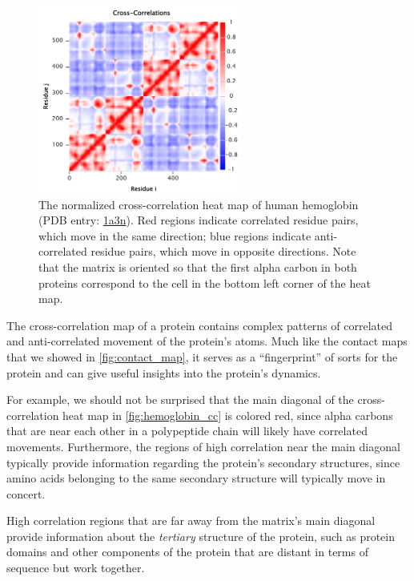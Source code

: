 \begin{figure}[h]
	\centering
	\mySfFamily
	\includegraphics[width = 0.6\textwidth]{../images/hemoglobin_cc.png}
	\caption{The normalized cross-correlation heat map of human hemoglobin (PDB entry: \href{https://www.rcsb.org/structure/1a3n}{1a3n}). Red regions indicate correlated residue pairs, which move in the same direction; blue regions indicate anti-correlated residue pairs, which move in opposite directions. Note that the matrix is oriented so that the first alpha carbon in both proteins correspond to the cell in the bottom left corner of the heat map.}
	\label{fig:hemoglobin_cc}
\end{figure}

The cross-correlation map of a protein contains complex patterns of correlated and anti-correlated movement of the protein's atoms. Much like the contact maps that we showed in \autoref{fig:contact_map}, it serves as a ``fingerprint'' of sorts for the protein and can give useful insights into the protein's dynamics.

For example, we should not be surprised that the main diagonal of the cross-correlation heat map in \autoref{fig:hemoglobin_cc} is colored red, since alpha carbons that are near each other in a polypeptide chain will likely have correlated movements. Furthermore, the regions of high correlation near the main diagonal typically provide information regarding the protein's secondary structures, since amino acids belonging to the same secondary structure will typically move in concert.

High correlation regions that are far away from the matrix's main diagonal provide information about the \textit{tertiary} structure of the protein, such as protein domains and other components of the protein that are distant in terms of sequence but work together.


